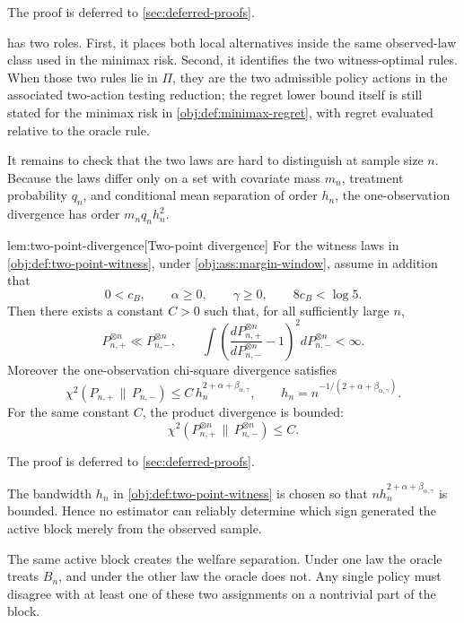 \documentclass[11pt]{article}
\begin{document}
The proof is deferred to \cref{sec:deferred-proofs}.

 has two roles.  First, it places both local alternatives inside the same observed-law class used in the minimax risk.  Second, it identifies the two witness-optimal rules.  When those two rules lie in \(\Pi\), they are the two admissible policy actions in the associated two-action testing reduction; the regret lower bound itself is still stated for the minimax risk in \cref{obj:def:minimax-regret}, with regret evaluated relative to the oracle rule.

It remains to check that the two laws are hard to distinguish at sample size \(n\).  Because the laws differ only on a set with covariate mass \(m_n\), treatment probability \(q_n\), and conditional mean separation of order \(h_n\), the one-observation divergence has order \(m_nq_nh_n^2\).

\begin{lemmav}{lem:two-point-divergence}[Two-point divergence]
For the witness laws in \cref{obj:def:two-point-witness}, under \cref{obj:ass:margin-window}, assume in addition that
\[
0<c_B,\qquad \alpha\ge 0,\qquad \gamma\ge 0,
\qquad 8c_B<\log 5.
\]
Then there exists a constant \(C>0\) such that, for all sufficiently large \(n\),
\[
P_{n,+}^{\otimes n}\ll P_{n,-}^{\otimes n},
\qquad
\int \left(\frac{dP_{n,+}^{\otimes n}}{dP_{n,-}^{\otimes n}}-1\right)^2
  dP_{n,-}^{\otimes n}<\infty.
\]
Moreover the one-observation chi-square divergence satisfies
\[
\chi^2(P_{n,+}\,\|\,P_{n,-})
 \le C\,h_n^{2+\alpha+\beta_{\alpha,\gamma}},
\qquad
h_n=n^{-1/(2+\alpha+\beta_{\alpha,\gamma})}.
\]
For the same constant \(C\), the product divergence is bounded:
\[
\chi^2(P_{n,+}^{\otimes n}\,\|\,P_{n,-}^{\otimes n})\le C.
\]
\end{lemmav}

The proof is deferred to \cref{sec:deferred-proofs}.

The bandwidth \(h_n\) in \cref{obj:def:two-point-witness} is chosen so that \(n h_n^{2+\alpha+\beta_{\alpha,\gamma}}\) is bounded.  Hence no estimator can reliably determine which sign generated the active block merely from the observed sample.

The same active block creates the welfare separation.  Under one law the oracle treats \(B_n\), and under the other law the oracle does not.  Any single policy must disagree with at least one of these two assignments on a nontrivial part of the block.
\end{document}
